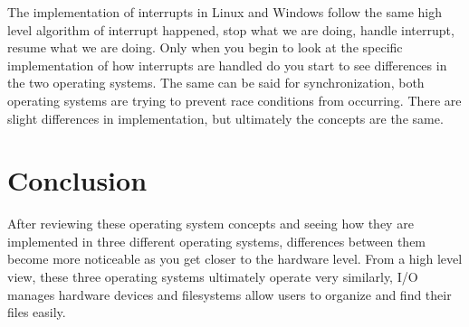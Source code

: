 \documentclass[10pt,serif,draftclsnofoot,onecolumn]{IEEEtran}
\begin{document}
	\newline
	\par
	The implementation of interrupts in Linux and Windows follow the same high level algorithm of interrupt happened, stop what we are doing, handle interrupt, resume what we are doing. Only when you begin to look at the specific implementation of how interrupts are handled do you start to see differences in the two operating systems. The same can be said for synchronization, both operating systems are trying to prevent race conditions from occurring. There are slight differences in implementation, but ultimately the concepts are the same. 
\section{Conclusion}
	\par
	After reviewing these operating system concepts and seeing how they are implemented in three different operating systems, differences between them become more noticeable as you get closer to the hardware level. From a high level view, these three operating systems ultimately operate very similarly, I/O manages hardware devices and filesystems allow users to organize and find their files easily. 
	\newpage
	
	
	
	
\end{document}
